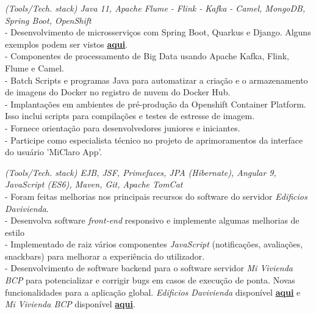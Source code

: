 \documentclass[]{CV-JuanCamiloFlorez}
\begin{document}
\begin{minipage}[t]{0.66\textwidth}
    \noindent
    \textit{(Tools/Tech. stack) Java 11, Apache Flume - Flink - Kafka - Camel, MongoDB, Spring Boot, OpenShift} \\
        - Desenvolvimento de microsserviços com Spring Boot, Quarkus e Django. Alguns exemplos podem ser vistos \textbf{\href{https://github.com/VanJFlorez/flink-kafka-fraud-detection}{aqui}}. \\
        - Componentes de processamento de Big Data usando Apache Kafka, Flink, Flume e Camel. \\
        - Batch Scripts e programas Java para automatizar a criação e o armazenamento de imagens do Docker no registro de nuvem do Docker Hub. \\
        - Implantações em ambientes de pré-produção da Openshift Container Platform. Isso inclui scripts para compilações e testes de estresse de imagem. \\
        - Fornece orientação para desenvolvedores juniores e iniciantes. \\
        - Participe como especialista técnico no projeto de aprimoramentos da interface do usuário 'MiClaro App'. \\
        \sectionsep

    \noindent
    \textit{(Tools/Tech. stack) EJB, JSF, Primefaces, JPA (Hibernate), Angular 9, JavaScript (ES6), Maven, Git, Apache TomCat} \\
        - Foram feitas melhorias nos principais recursos do software do servidor \textit{Edificios Davivienda}. \\
        - Desenvolva software \textit{front-end} responsivo e implemente algumas melhorias de estilo \\
        - Implementado de raiz vários componentes \textit{JavaScript} (notificações, avaliações, snackbars) para melhorar a experiência do utilizador. \\
        - Desenvolvimento de software backend para o software servidor \textit{Mi Vivienda BCP} para potencializar e corrigir bugs em casos de execução de ponta. Novas funcionalidades para a aplicação global. \textit{Edificios Davivienda} disponível \textbf{\href{https://www.edificiosdavivienda.com}{aqui}} e \textit{Mi Vivienda BCP} disponível \textbf{\href{https://www.miviviendabcp.com.bo}{aqui}}. \\
        \sectionsep


\end{minipage}
\end{document}
